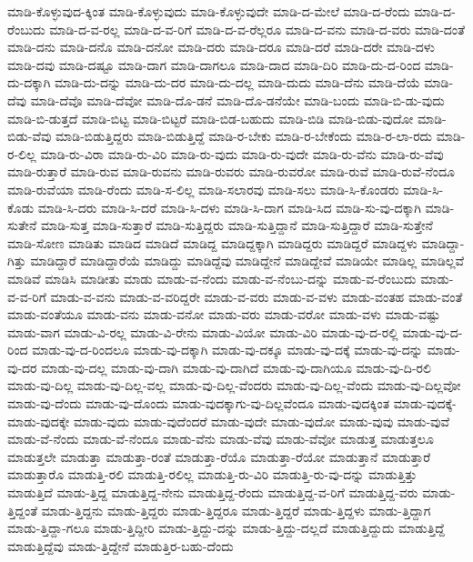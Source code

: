 {ಮಾಡಿ-ಕೊಳ್ಳುವುದ-ಕ್ಕಿಂತ
ಮಾಡಿ-ಕೊಳ್ಳುವುದು
ಮಾಡಿ-ಕೊಳ್ಳುವುದೇ
ಮಾಡಿ-ದ-ಮೇಲೆ
ಮಾಡಿ-ದ-ರೆಂದು
ಮಾಡಿ-ದ-ರೆಂಬುದು
ಮಾಡಿ-ದ-ವ-ರಲ್ಲ
ಮಾಡಿ-ದ-ವ-ರಿಗೆ
ಮಾಡಿ-ದ-ವ-ರೆಲ್ಲರೂ
ಮಾಡಿ-ದ-ವನು
ಮಾಡಿ-ದ-ವರು
ಮಾಡಿ-ದಂತೆ
ಮಾಡಿ-ದನು
ಮಾಡಿ-ದನೊ
ಮಾಡಿ-ದನೋ
ಮಾಡಿ-ದರು
ಮಾಡಿ-ದರೂ
ಮಾಡಿ-ದರೆ
ಮಾಡಿ-ದರೇ
ಮಾಡಿ-ದಳು
ಮಾಡಿ-ದವು
ಮಾಡಿ-ದಷ್ಟೂ
ಮಾಡಿ-ದಾಗ
ಮಾಡಿ-ದಾಗಲೂ
ಮಾಡಿ-ದಾದ
ಮಾಡಿ-ದಿರಿ
ಮಾಡಿ-ದು-ದ-ರಿಂದ
ಮಾಡಿ-ದು-ದಕ್ಕಾಗಿ
ಮಾಡಿ-ದು-ದನ್ನು
ಮಾಡಿ-ದು-ದರ
ಮಾಡಿ-ದು-ದಲ್ಲ
ಮಾಡಿ-ದುದು
ಮಾಡಿ-ದೆನು
ಮಾಡಿ-ದೆಯೆ
ಮಾಡಿ-ದೆವು
ಮಾಡಿ-ದೆವೊ
ಮಾಡಿ-ದೆವೋ
ಮಾಡಿ-ದೊ-ಡನೆ
ಮಾಡಿ-ದೊ-ಡನೆಯೇ
ಮಾಡಿ-ಬಂದು
ಮಾಡಿ-ಬಿ-ಡು-ವುದು
ಮಾಡಿ-ಬಿ-ಡುತ್ತದೆ
ಮಾಡಿ-ಬಿಟ್ಟ
ಮಾಡಿ-ಬಿಟ್ಟರೆ
ಮಾಡಿ-ಬಿಡ-ಬಹುದು
ಮಾಡಿ-ಬಿಡಿ
ಮಾಡಿ-ಬಿಡು-ವುದೋ
ಮಾಡಿ-ಬಿಡು-ವೆವು
ಮಾಡಿ-ಬಿಡುತ್ತಿದ್ದರು
ಮಾಡಿ-ಬಿಡುತ್ತಿದ್ದೆ
ಮಾಡಿ-ರ-ಬೇಕು
ಮಾಡಿ-ರ-ಬೇಕೆಂದು
ಮಾಡಿ-ರ-ಲಾ-ರದು
ಮಾಡಿ-ರ-ಲಿಲ್ಲ
ಮಾಡಿ-ರು-ವಿರಾ
ಮಾಡಿ-ರು-ವಿರಿ
ಮಾಡಿ-ರು-ವುದು
ಮಾಡಿ-ರು-ವುದೇ
ಮಾಡಿ-ರು-ವೆನು
ಮಾಡಿ-ರು-ವೆವು
ಮಾಡಿ-ರುತ್ತಾರೆ
ಮಾಡಿ-ರುವ
ಮಾಡಿ-ರುವನು
ಮಾಡಿ-ರುವರು
ಮಾಡಿ-ರುವರೋ
ಮಾಡಿ-ರುವೆ
ಮಾಡಿ-ರುವೆ-ನೆಂದೂ
ಮಾಡಿ-ರುವೆಯಾ
ಮಾಡಿ-ರೆಂದು
ಮಾಡಿ-ಸ-ಲಿಲ್ಲ
ಮಾಡಿ-ಸಲಾರವು
ಮಾಡಿ-ಸಲು
ಮಾಡಿ-ಸಿ-ಕೊಂಡರು
ಮಾಡಿ-ಸಿ-ಕೊಡು
ಮಾಡಿ-ಸಿ-ದರು
ಮಾಡಿ-ಸಿ-ದರೆ
ಮಾಡಿ-ಸಿ-ದಳು
ಮಾಡಿ-ಸಿ-ದಾಗ
ಮಾಡಿ-ಸಿದ
ಮಾಡಿ-ಸು-ವು-ದಕ್ಕಾಗಿ
ಮಾಡಿ-ಸುತೇನೆ
ಮಾಡಿ-ಸುತ್ತ
ಮಾಡಿ-ಸುತ್ತಾರೆ
ಮಾಡಿ-ಸುತ್ತಿದ್ದರು
ಮಾಡಿ-ಸುತ್ತಿದ್ದಾನೆ
ಮಾಡಿ-ಸುತ್ತಿದ್ದಾರೆ
ಮಾಡಿ-ಸುತ್ತೇನೆ
ಮಾಡಿ-ಸೋಣ
ಮಾಡಿತು
ಮಾಡಿದ
ಮಾಡಿದೆ
ಮಾಡಿದ್ದ
ಮಾಡಿದ್ದಕ್ಕಾಗಿ
ಮಾಡಿದ್ದರು
ಮಾಡಿದ್ದರೆ
ಮಾಡಿದ್ದಳು
ಮಾಡಿದ್ದಾ-ಗಿತ್ತು
ಮಾಡಿದ್ದಾರೆ
ಮಾಡಿದ್ದಾರೆಯೆ
ಮಾಡಿದ್ದು
ಮಾಡಿದ್ದೆವು
ಮಾಡಿದ್ದೇನೆ
ಮಾಡಿದ್ದೇವೆ
ಮಾಡಿಯೇ
ಮಾಡಿಲ್ಲ
ಮಾಡಿಲ್ಲವೆ
ಮಾಡಿವೆ
ಮಾಡಿಸಿ
ಮಾಡೀತು
ಮಾಡು
ಮಾಡು-ವ-ನೆಂದು
ಮಾಡು-ವ-ನೆಂಬು-ದನ್ನು
ಮಾಡು-ವ-ರೆಂಬುದು
ಮಾಡು-ವ-ವ-ರಿಗೆ
ಮಾಡು-ವ-ವನು
ಮಾಡು-ವ-ವರಿದ್ದರೇ
ಮಾಡು-ವ-ವರು
ಮಾಡು-ವ-ವಳು
ಮಾಡು-ವಂತಹ
ಮಾಡು-ವಂತೆ
ಮಾಡು-ವಂತೆಯೂ
ಮಾಡು-ವನು
ಮಾಡು-ವನೋ
ಮಾಡು-ವರು
ಮಾಡು-ವರೋ
ಮಾಡು-ವಳು
ಮಾಡು-ವಷ್ಟು
ಮಾಡು-ವಾಗ
ಮಾಡು-ವಿ-ರಲ್ಲ
ಮಾಡು-ವಿ-ರೇನು
ಮಾಡು-ವಿಯೋ
ಮಾಡು-ವಿರಿ
ಮಾಡು-ವು-ದ-ರಲ್ಲಿ
ಮಾಡು-ವು-ದ-ರಿಂದ
ಮಾಡು-ವು-ದ-ರಿಂದಲೂ
ಮಾಡು-ವು-ದಕ್ಕಾಗಿ
ಮಾಡು-ವು-ದಕ್ಕೂ
ಮಾಡು-ವು-ದಕ್ಕೆ
ಮಾಡು-ವು-ದನ್ನು
ಮಾಡು-ವು-ದರ
ಮಾಡು-ವು-ದಲ್ಲ
ಮಾಡು-ವು-ದಾಗಿ
ಮಾಡು-ವು-ದಾಗಿದೆ
ಮಾಡು-ವು-ದಾಗಿಯೂ
ಮಾಡು-ವು-ದಿ-ರಲಿ
ಮಾಡು-ವು-ದಿಲ್ಲ
ಮಾಡು-ವು-ದಿಲ್ಲ-ವಲ್ಲ
ಮಾಡು-ವು-ದಿಲ್ಲ-ವೆಂದರು
ಮಾಡು-ವು-ದಿಲ್ಲ-ವೆಂದು
ಮಾಡು-ವು-ದಿಲ್ಲವೋ
ಮಾಡು-ವು-ದೆಂದು
ಮಾಡು-ವು-ದೊಂದು
ಮಾಡು-ವುದಕ್ಕಾಗು-ವು-ದಿಲ್ಲವೆಂದೂ
ಮಾಡು-ವುದಕ್ಕಿಂತ
ಮಾಡು-ವುದಕ್ಕೆ-
ಮಾಡು-ವುದಕ್ಕೇ
ಮಾಡು-ವುದು
ಮಾಡು-ವುದೆಂದರೆ
ಮಾಡು-ವುದೇ
ಮಾಡು-ವುದೋ
ಮಾಡು-ವುವು
ಮಾಡು-ವುವೆ
ಮಾಡು-ವೆ-ನೆಂದು
ಮಾಡು-ವೆ-ನೆಂದೂ
ಮಾಡು-ವೆನು
ಮಾಡು-ವೆವು
ಮಾಡು-ವೆವೋ
ಮಾಡುತ್ತ
ಮಾಡುತ್ತಲೂ
ಮಾಡುತ್ತಲೇ
ಮಾಡುತ್ತಾ
ಮಾಡುತ್ತಾ-ರಂತೆ
ಮಾಡುತ್ತಾ-ರೆಯೊ
ಮಾಡುತ್ತಾ-ರೆಯೋ
ಮಾಡುತ್ತಾನೆ
ಮಾಡುತ್ತಾರೆ
ಮಾಡುತ್ತಾರೊ
ಮಾಡುತ್ತಿ-ರಲಿ
ಮಾಡುತ್ತಿ-ರಲಿಲ್ಲ
ಮಾಡುತ್ತಿ-ರು-ವಿರಿ
ಮಾಡುತ್ತಿ-ರು-ವು-ದನ್ನು
ಮಾಡುತ್ತಿತ್ತು
ಮಾಡುತ್ತಿದೆ
ಮಾಡು-ತ್ತಿದ್ದ
ಮಾಡುತ್ತಿದ್ದ-ನೇನು
ಮಾಡುತ್ತಿದ್ದ-ರೆಂದು
ಮಾಡುತ್ತಿದ್ದ-ವ-ರಿಗೆ
ಮಾಡುತ್ತಿದ್ದ-ವರು
ಮಾಡು-ತ್ತಿದ್ದಂತೆ
ಮಾಡು-ತ್ತಿದ್ದನು
ಮಾಡು-ತ್ತಿದ್ದರು
ಮಾಡು-ತ್ತಿದ್ದರೂ
ಮಾಡು-ತ್ತಿದ್ದರೆ
ಮಾಡು-ತ್ತಿದ್ದಳು
ಮಾಡು-ತ್ತಿದ್ದಾಗ
ಮಾಡು-ತ್ತಿದ್ದಾ-ಗಲೂ
ಮಾಡು-ತ್ತಿದ್ದೀರಿ
ಮಾಡು-ತ್ತಿದ್ದು-ದನ್ನು
ಮಾಡು-ತ್ತಿದ್ದು-ದಲ್ಲದೆ
ಮಾಡುತ್ತಿದ್ದುದು
ಮಾಡುತ್ತಿದ್ದೆ
ಮಾಡುತ್ತಿದ್ದೆವು
ಮಾಡು-ತ್ತಿದ್ದೇನೆ
ಮಾಡುತ್ತಿರ-ಬಹು-ದೆಂದು
}

